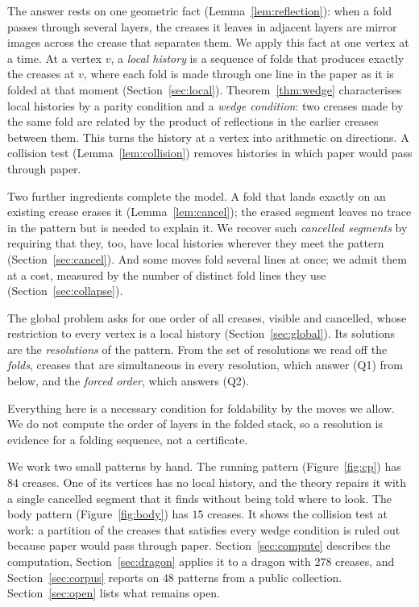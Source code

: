 \documentclass[11pt]{article}
\theoremstyle{definition}
\theoremstyle{remark}
\begin{document}
The answer rests on one geometric fact (Lemma~\ref{lem:reflection}): when a fold passes through several layers, the creases it leaves in adjacent layers are mirror images across the crease that separates them. We apply this fact at one vertex at a time. At a vertex $v$, a \emph{local history} is a sequence of folds that produces exactly the creases at $v$, where each fold is made through one line in the paper as it is folded at that moment (Section~\ref{sec:local}). Theorem~\ref{thm:wedge} characterises local histories by a parity condition and a \emph{wedge condition}: two creases made by the same fold are related by the product of reflections in the earlier creases between them. This turns the history at a vertex into arithmetic on directions. A collision test (Lemma~\ref{lem:collision}) removes histories in which paper would pass through paper.

Two further ingredients complete the model. A fold that lands exactly on an existing crease erases it (Lemma~\ref{lem:cancel}); the erased segment leaves no trace in the pattern but is needed to explain it. We recover such \emph{cancelled segments} by requiring that they, too, have local histories wherever they meet the pattern (Section~\ref{sec:cancel}). And some moves fold several lines at once; we admit them at a cost, measured by the number of distinct fold lines they use (Section~\ref{sec:collapse}).

The global problem asks for one order of all creases, visible and cancelled, whose restriction to every vertex is a local history (Section~\ref{sec:global}). Its solutions are the \emph{resolutions} of the pattern. From the set of resolutions we read off the \emph{folds}, creases that are simultaneous in every resolution, which answer (Q1) from below, and the \emph{forced order}, which answers (Q2).

Everything here is a necessary condition for foldability by the moves we allow. We do not compute the order of layers in the folded stack, so a resolution is evidence for a folding sequence, not a certificate.

We work two small patterns by hand. The running pattern (Figure~\ref{fig:cp}) has $84$ creases. One of its vertices has no local history, and the theory repairs it with a single cancelled segment that it finds without being told where to look. The body pattern (Figure~\ref{fig:body}) has $15$ creases. It shows the collision test at work: a partition of the creases that satisfies every wedge condition is ruled out because paper would pass through paper. Section~\ref{sec:compute} describes the computation, Section~\ref{sec:dragon} applies it to a dragon with $278$ creases, and Section~\ref{sec:corpus} reports on $48$ patterns from a public collection. Section~\ref{sec:open} lists what remains open.
\end{document}
